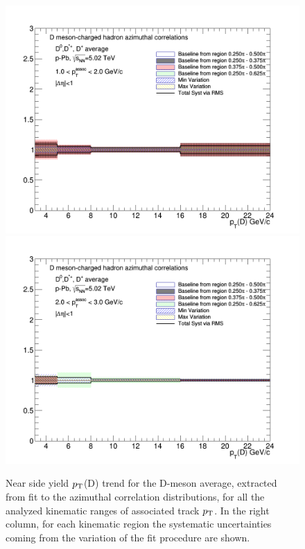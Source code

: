 \begin{figure}[!htbp]
{\includegraphics[width=0.49\linewidth, height=0.33\linewidth]{figures/FitOutput/BaselineSystematicSourcesNSYield_pthad1dotto2dot.png}}
{\includegraphics[width=0.49\linewidth, height=0.33\linewidth]{figures/FitOutput/BaselineSystematicSourcesNSYield_pthad2dotto3dot.png}}
\caption{Near side yield $p_{\rm T}$(D) trend for the D-meson average, extracted from fit to the azimuthal correlation distributions, for all the analyzed kinematic ranges of associated track $p_{\rm T}$. In the right column, for each kinematic region the systematic uncertainties coming from the variation of the fit procedure are shown.}
\label{fig:nearsideyieldAverage}
\end{figure}

